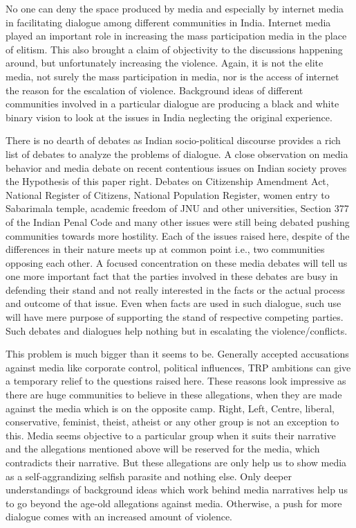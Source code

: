 \begin{multicols}{2}
\noi
No one can deny the space produced by media and especially by internet media in facilitating
dialogue among different communities in India. Internet media played an important role in
increasing the mass participation media in the place of elitism. This also brought a claim of
objectivity to the discussions happening around, but unfortunately increasing the violence. Again,
it is not the elite media, not surely the mass participation in media, nor is the access of internet
the reason for the escalation of violence. Background ideas of different communities involved in
a particular dialogue are producing a black and white binary vision to look at the issues in India
neglecting the original experience.

\noi
There is no dearth of debates as Indian socio-political discourse provides a rich list of debates to
analyze the problems of dialogue. A close observation on media behavior and media debate on
recent contentious issues on Indian society proves the Hypothesis of this paper right. Debates on
Citizenship Amendment Act, National Register of Citizens, National Population Register, women
entry to Sabarimala temple, academic freedom of JNU and other universities, Section 377 of the
Indian Penal Code and many other issues were still being debated pushing communities towards
more hostility. Each of the issues raised here, despite of the differences in their nature meets up
at common point i.e., two communities opposing each other. A focused concentration on these
media debates will tell us one more important fact that the parties involved in these debates are
busy in defending their stand and not really interested in the facts or the actual process and
outcome of that issue. Even when facts are used in such dialogue, such use will have mere purpose
of supporting the stand of respective competing parties. Such debates and dialogues help nothing
but in escalating the violence/conflicts.

\noi
This problem is much bigger than it seems to be. Generally accepted accusations against media
like corporate control, political influences, TRP ambitions can give a temporary relief to the
questions raised here. These reasons look impressive as there are huge communities to believe in
these allegations, when they are made against the media which is on the opposite camp. Right,
Left, Centre, liberal, conservative, feminist, theist, atheist or any other group is not an exception
to this. Media seems objective to a particular group when it suits their narrative and the allegations mentioned above will be reserved for the media, which contradicts their narrative. But these
allegations are only help us to show media as a self-aggrandizing selfish parasite and nothing else.
Only deeper understandings of background ideas which work behind media narratives help us to
go beyond the age-old allegations against media. Otherwise, a push for more dialogue comes with
an increased amount of violence.


\end{multicols}
